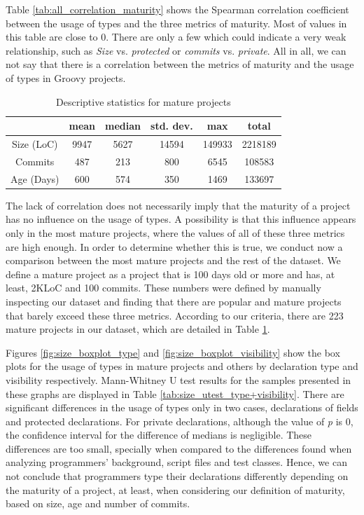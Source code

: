\documentclass[preprint]{sigplanconf}
\renewcommand{\arraystretch}{1.2}
\begin{document}
Table \ref{tab:all_correlation_maturity} shows the Spearman correlation coefficient between the usage of types and the three metrics of maturity.
Most of values in this table are close to 0.
There are only a few which could indicate a very weak relationship, such as \emph{Size} vs. \emph{protected} or \emph{commits} vs. \emph{private}.
All in all, we can not say that there is a correlation between the metrics of maturity and the usage of types in Groovy projects.
\begin{table}[h!]

\centering{}%
\renewcommand{\arraystretch}{1.2}

\begin{tabular}{|c|c|c|c|c|c|}
\hline
{}		& mean	& median	& std. dev.	& max	& total		\\
\hline
\hline
Size (LoC)	& 9947 	& 5627 & 14594  & 149933	& 2218189	\\ \hline
Commits   	& 487  	& 213    & 800   & 6545		& 108583	\\ \hline
Age (Days)  & 600  	& 574  & 350   & 1469		& 133697	\\ \hline
\end{tabular}
\caption{Descriptive statistics for mature projects}
\label{tab:mature_dataset_characterization}
\end{table}

The lack of correlation does not necessarily imply that the maturity of a project has no influence on the usage of types.
A possibility is that this influence appears only in the most mature projects, where the values of all of these three metrics are high enough.
In order to determine whether this is true, we conduct now a comparison between the most mature projects and the rest of the dataset.
We define a mature project as a project that is 100 days old or more and has, at least, 2KLoC and 100 commits.
These numbers were defined by manually inspecting our dataset and finding that there are popular and mature projects that barely exceed these three metrics.
According to our criteria, there are 223 mature projects in our dataset, which are detailed in Table \ref{tab:mature_dataset_characterization}.


Figures \ref{fig:size_boxplot_type}  and \ref{fig:size_boxplot_visibility} show the box plots for the usage of types in mature projects and others by declaration type and visibility respectively.
Mann-Whitney U test results for the samples presented in these graphs are displayed in Table \ref{tab:size_utest_type+visibility}.
There are significant differences in the usage of types only in two cases, declarations of fields and protected declarations.
For private declarations, although the value of \emph{p} is $0$, the confidence interval for the difference of medians is negligible.
These differences are too small, specially when compared to the differences found when analyzing programmers' background, script files and test classes.
Hence, we can not conclude that programmers type their declarations differently depending on the maturity of a project, at least, when considering our definition of maturity, based on size, age and number of commits.
\end{document}
